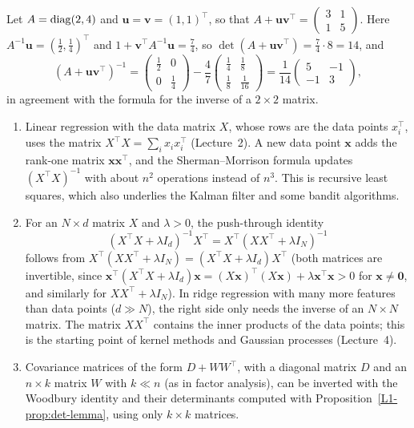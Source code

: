 \begin{example}\label{L1-ex:sherman-morrison}
    Let $A = \operatorname{diag}(2, 4)$ and $\mathbf{u} = \mathbf{v} = (1, 1)^\top$, so that $A + \mathbf{u}\mathbf{v}^\top = \begin{pmatrix} 3 & 1 \\ 1 & 5 \end{pmatrix}$. Here $A^{-1}\mathbf{u} = (\frac{1}{2}, \frac{1}{4})^\top$ and $1 + \mathbf{v}^\top A^{-1}\mathbf{u} = \frac{7}{4}$, so $\det(A + \mathbf{u}\mathbf{v}^\top) = \frac{7}{4} \cdot 8 = 14$, and
    \[(A + \mathbf{u}\mathbf{v}^\top)^{-1} = \begin{pmatrix} \frac{1}{2} & 0 \\ 0 & \frac{1}{4} \end{pmatrix} - \frac{4}{7}\begin{pmatrix} \frac{1}{4} & \frac{1}{8} \\ \frac{1}{8} & \frac{1}{16} \end{pmatrix} = \frac{1}{14}\begin{pmatrix} 5 & -1 \\ -1 & 3 \end{pmatrix},\]
    in agreement with the formula for the inverse of a $2 \times 2$ matrix.
\end{example}

\begin{remark}
    \begin{enumerate}
        \item Linear regression with the data matrix $X$, whose rows are the data points $x_i^\top$, uses the matrix $X^\top X = \sum_i x_ix_i^\top$ (Lecture~2). A new data point $\mathbf{x}$ adds the rank-one matrix $\mathbf{x}\mathbf{x}^\top$, and the Sherman--Morrison formula updates $(X^\top X)^{-1}$ with about $n^2$ operations instead of $n^3$. This is recursive least squares, which also underlies the Kalman filter and some bandit algorithms.
        \item For an $N \times d$ matrix $X$ and $\lambda > 0$, the push-through identity
        \[(X^\top X + \lambda I_d)^{-1}X^\top = X^\top(XX^\top + \lambda I_N)^{-1}\]
        follows from $X^\top(XX^\top + \lambda I_N) = (X^\top X + \lambda I_d)X^\top$ (both matrices are invertible, since $\mathbf{x}^\top(X^\top X + \lambda I_d)\mathbf{x} = (X\mathbf{x})^\top(X\mathbf{x}) + \lambda \mathbf{x}^\top \mathbf{x} > 0$ for $\mathbf{x} \neq \mathbf{0}$, and similarly for $XX^\top + \lambda I_N$). In ridge regression with many more features than data points ($d \gg N$), the right side only needs the inverse of an $N \times N$ matrix. The matrix $XX^\top$ contains the inner products of the data points; this is the starting point of kernel methods and Gaussian processes (Lecture~4).
        \item Covariance matrices of the form $D + WW^\top$, with a diagonal matrix $D$ and an $n \times k$ matrix $W$ with $k \ll n$ (as in factor analysis), can be inverted with the Woodbury identity and their determinants computed with Proposition~\ref{L1-prop:det-lemma}, using only $k \times k$ matrices.
    \end{enumerate}
\end{remark}

